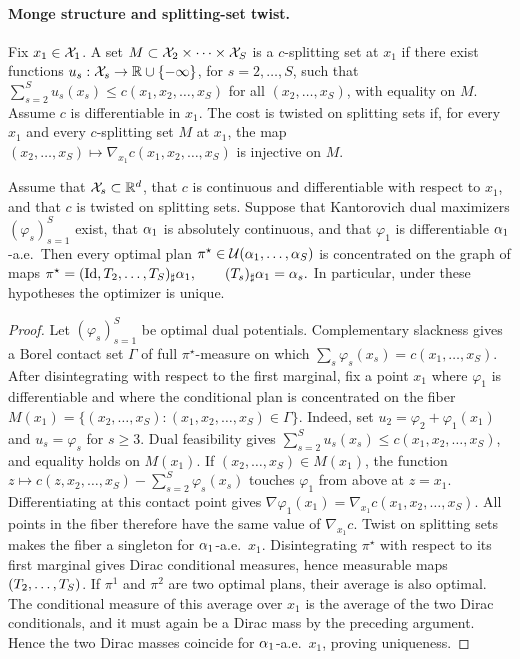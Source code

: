 \paragraph{Monge structure and splitting-set twist.}
\begin{defn}\label{def-twist-splitting-sets}
Fix $x_1\in\mathcal{X}_1$. A set $M\subset\mathcal{X}_2\times\cdots\times\mathcal{X}_S$ is a $c$-splitting set at $x_1$ if there exist functions $u_s:\mathcal{X}_s\to\mathbb{R}\cup\{-\infty\}$, for $s=2,\ldots,S$, such that
\(\sum_{s=2}^S u_s(x_s)\leq c(x_1,x_2,\ldots,x_S)\)
for all $(x_2,\ldots,x_S)$, with equality on $M$. Assume $c$ is differentiable in $x_1$. The cost is twisted on splitting sets if, for every $x_1$ and every $c$-splitting set $M$ at $x_1$, the map
\((x_2,\ldots,x_S) \longmapsto \nabla_{x_1}c(x_1,x_2,\ldots,x_S)\)
is injective on $M$.
\end{defn}
\begin{prop}\label{prop-multimarginal-monge-structure}
Assume that $\mathcal{X}_s\subset\mathbb{R}^d$, that $c$ is continuous and differentiable with respect to $x_1$, and that $c$ is twisted on splitting sets. Suppose that Kantorovich dual maximizers $(\varphi_s)_{s=1}^S$ exist, that $\alpha_1$ is absolutely continuous, and that $\varphi_1$ is differentiable $\alpha_1$-a.e.\ Then every optimal plan $\pi^\star\in\mathcal{U}(\alpha_1,\ldots,\alpha_S)$ is concentrated on the graph of maps
\(\pi^\star=(\mathrm{Id},T_2,\ldots,T_S)_\sharp\alpha_1, \qquad (T_s)_\sharp\alpha_1=\alpha_s.\)
In particular, under these hypotheses the optimizer is unique.
\end{prop}
\begin{proof}
Let $(\varphi_s)_{s=1}^S$ be optimal dual potentials. Complementary slackness gives a Borel contact set $\Gamma$ of full $\pi^\star$-measure on which $\sum_s\varphi_s(x_s)=c(x_1,\ldots,x_S)$. After disintegrating with respect to the first marginal, fix a point $x_1$ where $\varphi_1$ is differentiable and where the conditional plan is concentrated on the fiber
\(M(x_1)=\{(x_2,\ldots,x_S):(x_1,x_2,\ldots,x_S)\in\Gamma\}.\)
Indeed, set $u_2=\varphi_2+\varphi_1(x_1)$ and $u_s=\varphi_s$ for $s\geq3$. Dual feasibility gives $\sum_{s=2}^S u_s(x_s)\leq c(x_1,x_2,\ldots,x_S)$, and equality holds on $M(x_1)$. If $(x_2,\ldots,x_S)\in M(x_1)$, the function
\(z\longmapsto c(z,x_2,\ldots,x_S)-\sum_{s=2}^S\varphi_s(x_s)\)
touches $\varphi_1$ from above at $z=x_1$. Differentiating at this contact point gives \(\nabla\varphi_1(x_1)=\nabla_{x_1}c(x_1,x_2,\ldots,x_S).\)
All points in the fiber therefore have the same value of $\nabla_{x_1}c$. Twist on splitting sets makes the fiber a singleton for $\alpha_1$-a.e.\ $x_1$. Disintegrating $\pi^\star$ with respect to its first marginal gives Dirac conditional measures, hence measurable maps $(T_2,\ldots,T_S)$. If $\pi^1$ and $\pi^2$ are two optimal plans, their average is also optimal. The conditional measure of this average over $x_1$ is the average of the two Dirac conditionals, and it must again be a Dirac mass by the preceding argument. Hence the two Dirac masses coincide for $\alpha_1$-a.e.\ $x_1$, proving uniqueness.
\end{proof}
